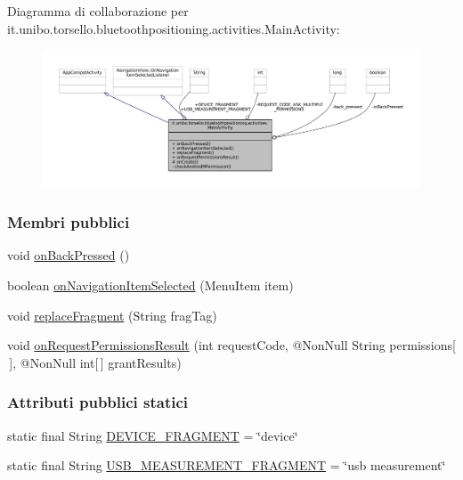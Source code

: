 Diagramma di collaborazione per it.\+unibo.\+torsello.\+bluetoothpositioning.\+activities.\+Main\+Activity\+:
\nopagebreak
\begin{figure}[H]
\begin{center}
\leavevmode
\includegraphics[width=350pt]{classit_1_1unibo_1_1torsello_1_1bluetoothpositioning_1_1activities_1_1MainActivity__coll__graph}
\end{center}
\end{figure}
\subsubsection*{Membri pubblici}
\begin{DoxyCompactItemize}
\item 
void \hyperlink{classit_1_1unibo_1_1torsello_1_1bluetoothpositioning_1_1activities_1_1MainActivity_ab0010b6d3fe518fabfea843626d7b5f1_ab0010b6d3fe518fabfea843626d7b5f1}{on\+Back\+Pressed} ()
\item 
boolean \hyperlink{classit_1_1unibo_1_1torsello_1_1bluetoothpositioning_1_1activities_1_1MainActivity_a7cfc0a2ee94c12afaac3b7472eeb75b7_a7cfc0a2ee94c12afaac3b7472eeb75b7}{on\+Navigation\+Item\+Selected} (Menu\+Item item)
\item 
void \hyperlink{classit_1_1unibo_1_1torsello_1_1bluetoothpositioning_1_1activities_1_1MainActivity_a98db4478d28cd91118138d0b652ceb2c_a98db4478d28cd91118138d0b652ceb2c}{replace\+Fragment} (String frag\+Tag)
\item 
void \hyperlink{classit_1_1unibo_1_1torsello_1_1bluetoothpositioning_1_1activities_1_1MainActivity_a81d7581dfa4998b2ad8139f103328cf9_a81d7581dfa4998b2ad8139f103328cf9}{on\+Request\+Permissions\+Result} (int request\+Code, @Non\+Null String permissions\mbox{[}$\,$\mbox{]}, @Non\+Null int\mbox{[}$\,$\mbox{]} grant\+Results)
\end{DoxyCompactItemize}
\subsubsection*{Attributi pubblici statici}
\begin{DoxyCompactItemize}
\item 
static final String \hyperlink{classit_1_1unibo_1_1torsello_1_1bluetoothpositioning_1_1activities_1_1MainActivity_a2f77c0245ac2525dc58905e38e1817d1_a2f77c0245ac2525dc58905e38e1817d1}{D\+E\+V\+I\+C\+E\+\_\+\+F\+R\+A\+G\+M\+E\+NT} = \char`\"{}device\char`\"{}
\item 
static final String \hyperlink{classit_1_1unibo_1_1torsello_1_1bluetoothpositioning_1_1activities_1_1MainActivity_a64bac06e6db556ba1e36c8773e61137b_a64bac06e6db556ba1e36c8773e61137b}{U\+S\+B\+\_\+\+M\+E\+A\+S\+U\+R\+E\+M\+E\+N\+T\+\_\+\+F\+R\+A\+G\+M\+E\+NT} = \char`\"{}usb measurement\char`\"{}
\end{DoxyCompactItemize}
